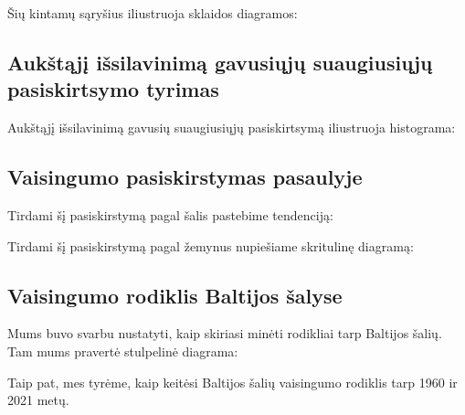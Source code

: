 Šių kintamų sąryšius iliustruoja sklaidos diagramos:
\begin{multicols}{2}
\end{multicols}

\subsection{Aukštąjį išsilavinimą gavusiųjų suaugiusiųjų pasiskirtsymo tyrimas} 

Aukštąjį išsilavinimą gavusių suaugiusiųjų pasiskirtsymą iliustruoja histograma:

\subsection{Vaisingumo pasiskirstymas pasaulyje}
Tirdami šį pasiskirstymą pagal šalis pastebime tendenciją:

Tirdami šį pasiskirstymą pagal žemynus nupiešiame skritulinę diagramą:

\subsection{Vaisingumo rodiklis Baltijos šalyse}
Mums buvo svarbu nustatyti, kaip skiriasi minėti rodikliai tarp Baltijos šalių.
Tam mums pravertė stulpelinė diagrama:

Taip pat, mes tyrėme, kaip keitėsi Baltijos šalių vaisingumo rodiklis tarp 1960 ir 2021 metų.
